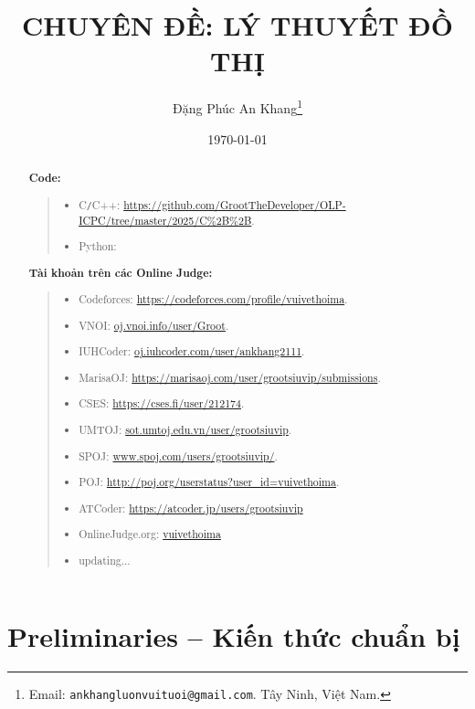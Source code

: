 \documentclass{article}
\title{CHUYÊN ĐỀ: LÝ THUYẾT ĐỒ THỊ}
\author{Đặng Phúc An Khang\footnote{ Email: {\tt ankhangluonvuituoi@gmail.com}. Tây Ninh, Việt Nam.}}
\date{\today}
\begin{document}
\maketitle
\begin{abstract}
	
	
	\textbf{Code:}
	\begin{quote}
		\begin{itemize}
			\item C{\tt/}C++: \url{https://github.com/GrootTheDeveloper/OLP-ICPC/tree/master/2025/C%2B%2B}.
			\item Python: \url{}\\
		\end{itemize}
	\end{quote}
	
	\textbf{Tài khoản trên các Online Judge:}
	\begin{quote}
    	\begin{itemize}
			\item Codeforces: \url{https://codeforces.com/profile/vuivethoima}.
			\item VNOI: \url{oj.vnoi.info/user/Groot}.
			\item IUHCoder: \url{oj.iuhcoder.com/user/ankhang2111}.
			\item MarisaOJ: \url{https://marisaoj.com/user/grootsiuvip/submissions}.
			\item CSES: \url{https://cses.fi/user/212174}.
			\item UMTOJ: \url{sot.umtoj.edu.vn/user/grootsiuvip}.
			\item SPOJ: \url{www.spoj.com/users/grootsiuvip/}.
			\item POJ: \url{http://poj.org/userstatus?user_id=vuivethoima}.
			\item ATCoder: \url{https://atcoder.jp/users/grootsiuvip}
			\item OnlineJudge.org: \url{vuivethoima}
			\item updating...
		\end{itemize}
	\end{quote}
    
\end{abstract}
\tableofcontents


\section{Preliminaries -- Kiến thức chuẩn bị}
\end{document}
